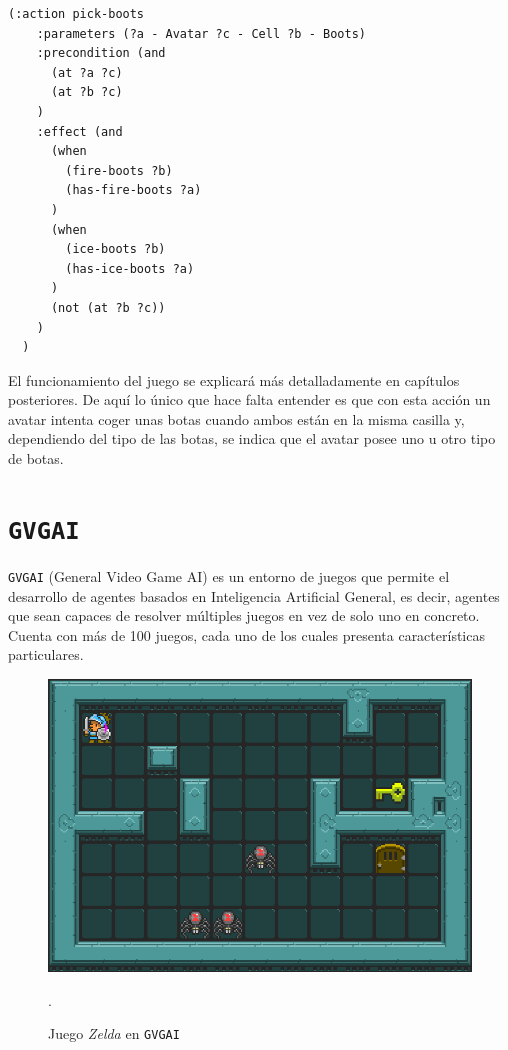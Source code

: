\begin{lstlisting}[language=PDDL, caption={Ejemplo de efecto condicional.},captionpos=b]
  (:action pick-boots
    :parameters (?a - Avatar ?c - Cell ?b - Boots)
    :precondition (and
      (at ?a ?c)
      (at ?b ?c)
    )
    :effect (and
      (when
        (fire-boots ?b)
        (has-fire-boots ?a)
      )
      (when
        (ice-boots ?b)
        (has-ice-boots ?a)
      )
      (not (at ?b ?c))
    )
  )
\end{lstlisting}

El funcionamiento del juego se explicará más detalladamente en capítulos posteriores. De aquí
lo único que hace falta entender es que con esta acción un avatar intenta coger unas botas cuando
ambos están en la misma casilla y, dependiendo del tipo de las botas, se indica que
el avatar posee uno u otro tipo de botas.

\section{\texttt{GVGAI}}

\texttt{GVGAI} (General Video Game AI) \cite{7038214} es un entorno de juegos que permite
el desarrollo de agentes basados en Inteligencia Artificial General, es decir, agentes que sean
capaces de resolver múltiples juegos en vez de solo uno en concreto. Cuenta con más de 100 juegos,
cada uno de los cuales presenta características particulares.

\begin{figure}[H]
    \centering
    \includegraphics[scale=0.4]{img/CH02/zelda.png}
    \caption{Juego \textit{Zelda} en \texttt{GVGAI}}.
    \label{fig:zelda}
\end{figure}

